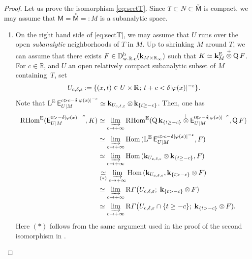 \documentclass[11pt]{article}
\numberwithin{equation}{section}
\newenvironment{enumeratei}
{\bgroup\def\theenumi{\roman{enumi}}\def\theenumii{\alph{enumii}}\begin{enumerate}}
{\end{enumerate}\egroup}
\newcommand{\accentset}[2]{\overset{#1}{#2}}
\newcommand{\semicolon}{\nobreak \mskip2mu\mathpunct{}\nonscript\mkern-\thinmuskip{;}\mskip6mu plus1mu\relax}
\newcommand{\bl}{\bigl(}
\theoremstyle{plain}
\theoremstyle{definition}
\newcommand{\R}{\mathbb{R}}
\newcommand{\bR}{{\R_\infty}}
\DeclareMathOperator{\quot}{Q}
\newcommand{\derived}[1]{\mathrm{#1}}
\newcommand{\derd}{\derived{D}}
\newcommand{\derr}{\derived{R}}
\newcommand{\BDC}{\derd^{\mathrm{b}}}
\newcommand{\Hom}[1][]{\mathrm{Hom}_{\raise1.5ex\hbox to.1em{}#1}}
\newcommand{\RHom}[1][]{\derr\mathrm{Hom}_{\raise1.5ex\hbox to.1em{}#1}}
\newcommand{\FHom}{\RHom^\enh}
\newcommand{\LE}{\operatorname{L^\enh}}
\newcommand{\wRc}{{\mathrm{w}\text-\R\text-\mathrm{c}}}
\newcommand{\field}{\mathbf{k}}\let\cor\field
\newcommand{\unbordered}[1]{{\accentset{\circ}{#1}}}
\newcommand{\ctens}{\mathbin{\mathop\otimes\limits^+}}
\newcommand{\range}[2]{#1 \mathbin{\rhd} #2}
\newcommand{\rsect}{\derr\varGamma}
\newcommand{\bbM}{\mathsf{M}}
\newcommand{\obM}{\unbordered{\bbM}}
\newcommand{\defeq}{\mathbin{:=}}\let \seteq\defeq
\newcommand{\eqdef}{\mathbin{=:}}
\newcommand{\tens}[1][]{\mathbin{\otimes_{\raise1.5ex\hbox to-.1em{}#1}}}
\newcommand{\ilim}[1][]{\mathop{\varinjlim}\limits_{#1}}
\newcommand{\st}[1]{{\{{#1}\}}}
\begin{document}
\begin{proof}
Let us prove the isomorphism \eqref{eq:sectT}. Since $T\subset N\subset \obM$ is compact,
we may assume that $\bbM=\obM\eqdef M$ is a subanalytic space.

\begin{enumeratei}
\item\label{pf:i}
On the right hand side of \eqref{eq:sectT}, we may assume that $U$ runs over the open \emph{subanalytic} neighborhoods of $T$ in $M$.
Up to shrinking $M$ around $T$, we can assume that there exists $F\in\BDC_\wRc
(\field_{M\times\bR})$ such that $K \simeq \field_M^\enh\ctens \quot F$. For $c\in\R$, and $U$ an open relatively compact subanalytic subset of $M$ containing~$T$, set
\[
U_{c,\delta,\varepsilon} \defeq \st{(x,t)\in U\times\R \semicolon t+c<\delta|\varphi(x)|^{-\varepsilon}}.
\]
Note that $\LE \exx^{\range{c}{c-\delta|\varphi(x)|^{-\varepsilon}}}_{U|M} \simeq \field_{U_{c,\delta,\varepsilon}}\tens\field_{\st{ t\geq -c}}$.
Then, one has
\begin{align*}
\FHom(\exx^{\range0{-\delta|\varphi(x)|^{-\varepsilon}}}_{U|M},K)
&\simeq
\ilim[c\to+\infty]\FHom(\quot\field_{\st{t\geq -c}}\ctens\exx^{\range0{-\delta|\varphi(x)|^{-\varepsilon}}}_{U|M},\quot F) \\
&\simeq
\ilim[c\to+\infty]\Hom(\LE\exx^{\range{c}{c-\delta|\varphi(x)|^{-\varepsilon}}}_{U|M},F) \\
&\simeq
\ilim[c\to+\infty]\Hom(\field_{U_{c,\delta,\varepsilon}}\tens\field_{\st{t\geq -c}}, F) \\
&\underset{(*)}\simeq \ilim[c\to+\infty]\Hom(\field_{U_{c,\delta,\varepsilon}},\field_{\st{t> -c}}\tens F) \\
&\simeq
\ilim[c\to+\infty]\rsect\bl U_{c,\delta,\varepsilon};\;\field_{\st{t> -c}}\tens F)\\
&\simeq
\ilim[c\to+\infty]\rsect\bl U_{c,\delta,\varepsilon}\cap\st{t\ge-c};\;\field_{\st{t> -c}}\tens F).
\end{align*}
Here $(*)$ follows from the same argument used in the proof of the second isomorphism in \cite[(6.6.2)]{KS16}.


\end{enumeratei}
\end{proof}
\end{document}
